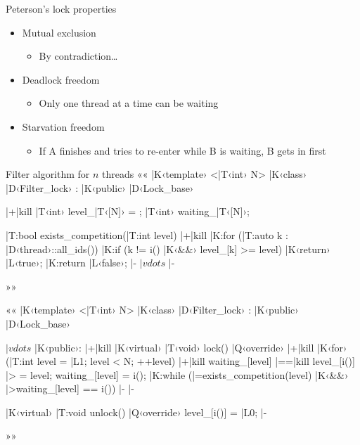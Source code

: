 \documentclass{beamer}
\begin{document}
\begin{frame}{Peterson's lock properties}
  \begin{itemize}
    \item Mutual exclusion
      \begin{itemize}
        \item By contradiction\ldots
      \end{itemize}
    \item Deadlock freedom
      \begin{itemize}
        \item Only one thread at a time can be waiting
      \end{itemize}
    \item Starvation freedom
      \begin{itemize}
        \item If A finishes and tries to re-enter while B is waiting, B gets
          in first
      \end{itemize}
  \end{itemize}
\end{frame}

\begin{frame}[fragile]{Filter algorithm for $n$ threads}{}
  ««
  |K‹template› <|T‹int› N>
  |K‹class› |D‹Filter_lock› : |K‹public› |D‹Lock_base›
  {
  	|+|kill%
    |T‹int› level_|T‹[N]› = {};
    |T‹int› waiting_|T‹[N]›;

    |T:bool exists_competition(|T:int level)
    {
    	|+|kill%
      |K:for (|T:auto k : |D‹thread›::all_ids())
      	|K:if (k != i() |K‹&&› level_[k] >= level)
      		|K‹return› |L‹true›;
      |K:return |L‹false›; |-
    }
    $|vdots$ |-
  }
  »»
\end{frame}

\begin{frame}[fragile]{}{}
  ««
  |K‹template› <|T‹int› N>
  |K‹class› |D‹Filter_lock› : |K‹public› |D‹Lock_base›
  {
  $|vdots$
  |K‹public›:
  	|+|kill%
    |K‹virtual› |T‹void› lock() |Q‹override›
    {
    	|+|kill%
      |K‹for› (|T:int level = |L1; level < N; ++level) {
      	|+|kill%
        waiting_[level] |==|kill%
        level_[i()] |> = level;
        waiting_[level] = i();
        |K:while (|=exists_competition(level) |K‹&&›
                  |>waiting_[level] == i()) {} |-
      } |-
    }
    
    |K‹virtual› |T:void unlock() |Q‹override›
    { level_[i()] = |L0; } |-
  }
  »»
\end{frame}
\end{document}
